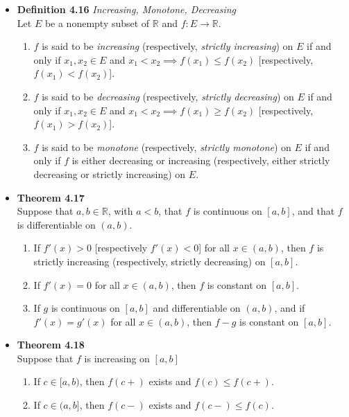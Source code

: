 \documentclass[11pt,a4paper]{article}
\begin{document}
\begin{itemize}
    \item \textbf{Definition 4.16} \emph{Increasing, Monotone, Decreasing} \\
        Let $E$ be a nonempty subset of $\mathbb{R}$ and $f : E \to \mathbb{R}$.
        \begin{enumerate}
            \item $f$ is said to be \emph{increasing}
                (respectively, \emph{strictly increasing}) on $E$ if and only if
                $x_1, x_2 \in E$ and $x_1 < x_2 \implies f(x_1) \leq f(x_2)$
                [respectively, $f(x_1) < f(x_2)$].
            \item $f$ is said to be \emph{decreasing}
                (respectively, \emph{strictly decreasing}) on $E$ if and only if
                $x_1, x_2 \in E$ and $x_1 < x_2 \implies f(x_1) \geq f(x_2)$
                [respectively, $f(x_1) > f(x_2)$].
            \item $f$ is said to be \emph{monotone} (respectively, \emph{strictly monotone})
                on $E$ if and only if $f$ is either decreasing or increasing
                (respectively, either strictly decreasing or strictly increasing) on $E$.
        \end{enumerate}

    \item \textbf{Theorem 4.17} \\
        Suppose that $a, b \in \mathbb{R}$, with $a<b$, that $f$ is continuous on $[a, b]$,
        and that $f$ is differentiable on $(a, b)$.
        \begin{enumerate}
            \item If $f'(x) > 0$ [respectively $f'(x) < 0$] for all $x \in (a, b)$,
                then $f$ is strictly increasing (respectively, strictly decreasing) on
                $[a, b]$.
            \item If $f'(x) = 0$ for all $x \in (a, b)$, then $f$ is constant on $[a, b]$.
            \item If $g$ is continuous on $[a, b]$ and differentiable on $(a, b)$,
                and if $f'(x) = g'(x)$ for all $x \in (a, b)$, then $f-g$ is constant on
                $[a, b]$.
        \end{enumerate}

    \item \textbf{Theorem 4.18} \\
        Suppose that $f$ is increasing on $[a, b]$
        \begin{enumerate}
            \item If $c \in [a, b)$, then $f(c+)$ exists and $f(c) \leq f(c+)$.
            \item If $c \in (a, b]$, then $f(c-)$ exists and $f(c-) \leq f(c)$.
        \end{enumerate}


\end{itemize}
\end{document}
